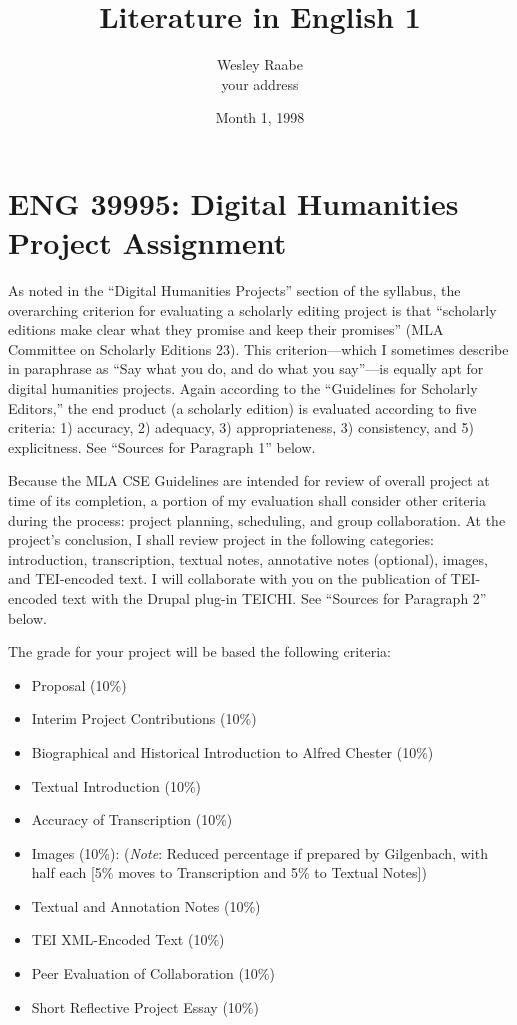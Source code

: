 \documentclass[9pt,oneside,notitlepageletterpaperopenright]{article}
\title{Literature in English 1}
\author{Wesley Raabe\\ your address}
\date{Month 1, 1998}
\begin{document}
\section*{ENG 39995: Digital Humanities Project
Assignment}\label{eng-39995-digital-humanities-project-assignment}

As noted in the ``Digital Humanities Projects'' section of the syllabus,
the overarching criterion for evaluating a scholarly editing project is
that ``scholarly editions make clear what they promise and keep their
promises'' (MLA Committee on Scholarly Editions 23). This
criterion---which I sometimes describe in paraphrase as ``Say what you
do, and do what you say''---is equally apt for digital humanities
projects. Again according to the ``Guidelines for Scholarly Editors,''
the end product (a scholarly edition) is evaluated according to five
criteria: 1) accuracy, 2) adequacy, 3) appropriateness, 3) consistency,
and 5) explicitness. See ``Sources for Paragraph 1'' below.

Because the MLA CSE Guidelines are intended for review of overall
project at time of its completion, a portion of my evaluation shall
consider other criteria during the process: project planning,
scheduling, and group collaboration. At the project's conclusion, I
shall review project in the following categories: introduction,
transcription, textual notes, annotative notes (optional), images, and
TEI-encoded text. I will collaborate with you on the publication of
TEI-encoded text with the Drupal plug-in TEICHI. See ``Sources for
Paragraph 2'' below.

The grade for your project will be based the following criteria:

\begin{itemize}
\itemsep1pt\parskip0pt
\item
  Proposal (10\%)
\item
  Interim Project Contributions (10\%)
\item
  Biographical and Historical Introduction to Alfred Chester (10\%)
\item
  Textual Introduction (10\%)
\item
  Accuracy of Transcription (10\%)
\item
  Images (10\%): (\emph{Note}: Reduced percentage if prepared by
  Gilgenbach, with half each {[}5\% moves to Transcription and 5\% to
  Textual Notes{]})
\item
  Textual and Annotation Notes (10\%)
\item
  TEI XML-Encoded Text (10\%)
\item
  Peer Evaluation of Collaboration (10\%)
\item
  Short Reflective Project Essay (10\%)
\end{itemize}
\end{document}
